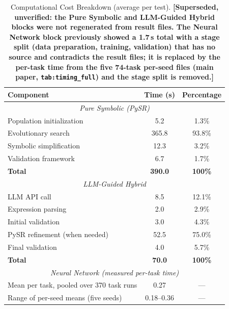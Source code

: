 \documentclass[twoside,11pt]{article}
\begin{document}
\begin{table}[H]
\centering
\caption{Computational Cost Breakdown (average per test).
  \textbf{[Superseded, unverified: the Pure Symbolic and LLM-Guided Hybrid blocks
  were not regenerated from result files. The Neural Network block previously showed a
  1.7\,s total with a stage split (data preparation, training, validation) that has no
  source and contradicts the result files; it is replaced by the per-task time from the
  five 74-task per-seed files (main paper, \texttt{tab:timing\_full}) and the stage split
  is removed.]}}
\label{tab:timing_breakdown}
\begin{tabular}{@{}lcc@{}}
\toprule
\textbf{Component} & \textbf{Time (s)} & \textbf{Percentage} \\
\midrule
\multicolumn{3}{c}{\textit{Pure Symbolic (PySR)}} \\
\midrule
Population initialization & 5.2 & 1.3\% \\
Evolutionary search & 365.8 & 93.8\% \\
Symbolic simplification & 12.3 & 3.2\% \\
Validation framework & 6.7 & 1.7\% \\
\midrule
\textbf{Total} & \textbf{390.0} & \textbf{100\%} \\
\midrule
\multicolumn{3}{c}{\textit{LLM-Guided Hybrid}} \\
\midrule
LLM API call & 8.5 & 12.1\% \\
Expression parsing & 2.0 & 2.9\% \\
Initial validation & 3.0 & 4.3\% \\
PySR refinement (when needed) & 52.5 & 75.0\% \\
Final validation & 4.0 & 5.7\% \\
\midrule
\textbf{Total} & \textbf{70.0} & \textbf{100\%} \\
\midrule
\multicolumn{3}{c}{\textit{Neural Network (measured per-task time)}} \\
\midrule
Mean per task, pooled over 370 task runs & 0.27 & --- \\
Range of per-seed means (five seeds) & 0.18--0.36 & --- \\
\bottomrule
\end{tabular}
\end{table}
\end{document}

